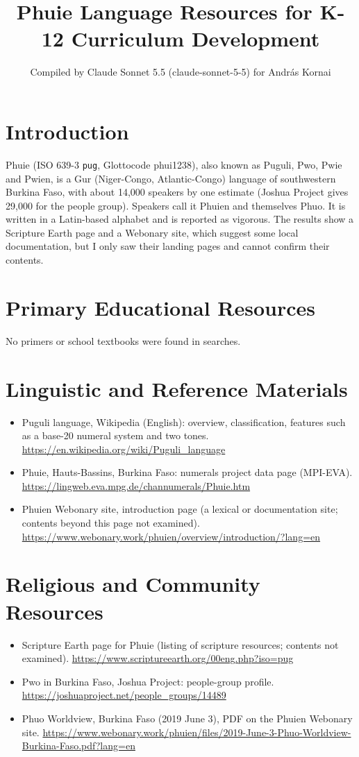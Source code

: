 \documentclass[12pt]{article}
\title{Phuie Language Resources for K-12 Curriculum Development}
\author{Compiled by Claude Sonnet 5.5 (claude-sonnet-5-5) for Andr\'as Kornai}
\date{}
\begin{document}
\maketitle

\section{Introduction}
Phuie (ISO 639-3 \texttt{pug}, Glottocode phui1238), also known as Puguli, Pwo, Pwie and Pwien, is a Gur (Niger-Congo, Atlantic-Congo) language of southwestern Burkina Faso, with about 14,000 speakers by one estimate (Joshua Project gives 29,000 for the people group). Speakers call it Phuien and themselves Phuo. It is written in a Latin-based alphabet and is reported as vigorous. The results show a Scripture Earth page and a Webonary site, which suggest some local documentation, but I only saw their landing pages and cannot confirm their contents.

\section{Primary Educational Resources}
No primers or school textbooks were found in searches.

\section{Linguistic and Reference Materials}
\begin{itemize}
\item Puguli language, Wikipedia (English): overview, classification, features such as a base-20 numeral system and two tones. \url{https://en.wikipedia.org/wiki/Puguli_language}
\item Phuie, Hauts-Bassins, Burkina Faso: numerals project data page (MPI-EVA). \url{https://lingweb.eva.mpg.de/channumerals/Phuie.htm}
\item Phuien Webonary site, introduction page (a lexical or documentation site; contents beyond this page not examined). \url{https://www.webonary.work/phuien/overview/introduction/?lang=en}
\end{itemize}

\section{Religious and Community Resources}
\begin{itemize}
\item Scripture Earth page for Phuie (listing of scripture resources; contents not examined). \url{https://www.scriptureearth.org/00eng.php?iso=pug}
\item Pwo in Burkina Faso, Joshua Project: people-group profile. \url{https://joshuaproject.net/people_groups/14489}
\item Phuo Worldview, Burkina Faso (2019 June 3), PDF on the Phuien Webonary site. \url{https://www.webonary.work/phuien/files/2019-June-3-Phuo-Worldview-Burkina-Faso.pdf?lang=en}
\end{itemize}
\end{document}
